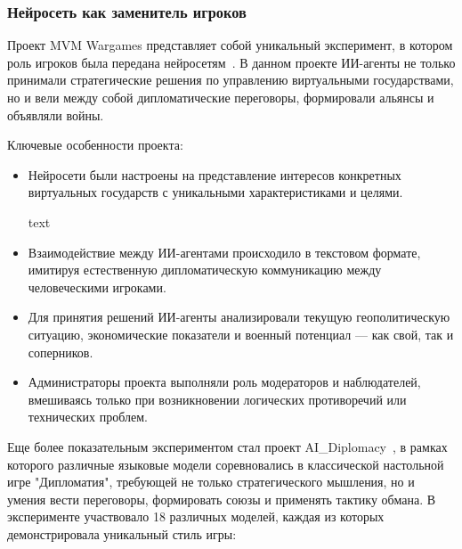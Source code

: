 \subsubsection{Нейросеть как заменитель игроков}

Проект MVM Wargames представляет собой уникальный эксперимент, в котором роль игроков была передана нейросетям~\cite{mvmwargames}. В данном проекте ИИ-агенты не только принимали стратегические решения по управлению виртуальными государствами, но и вели между собой дипломатические переговоры, формировали альянсы и объявляли войны.

Ключевые особенности проекта:

\begin{itemize}
\item Нейросети были настроены на представление интересов конкретных виртуальных государств с уникальными характеристиками и целями.

text
\item Взаимодействие между ИИ-агентами происходило в текстовом формате, имитируя естественную дипломатическую коммуникацию между человеческими игроками.

\item Для принятия решений ИИ-агенты анализировали текущую геополитическую ситуацию, экономические показатели и военный потенциал — как свой, так и соперников.

\item Администраторы проекта выполняли роль модераторов и наблюдателей, вмешиваясь только при возникновении логических противоречий или технических проблем.
\end{itemize}

Еще более показательным экспериментом стал проект AI\_Diplomacy~\cite{ai_diplomacy}, в рамках которого различные языковые модели соревновались в классической настольной игре "{}Дипломатия"{}, требующей не только стратегического мышления, но и умения вести переговоры, формировать союзы и применять тактику обмана. В эксперименте участвовало 18 различных моделей, каждая из которых демонстрировала уникальный стиль игры:

